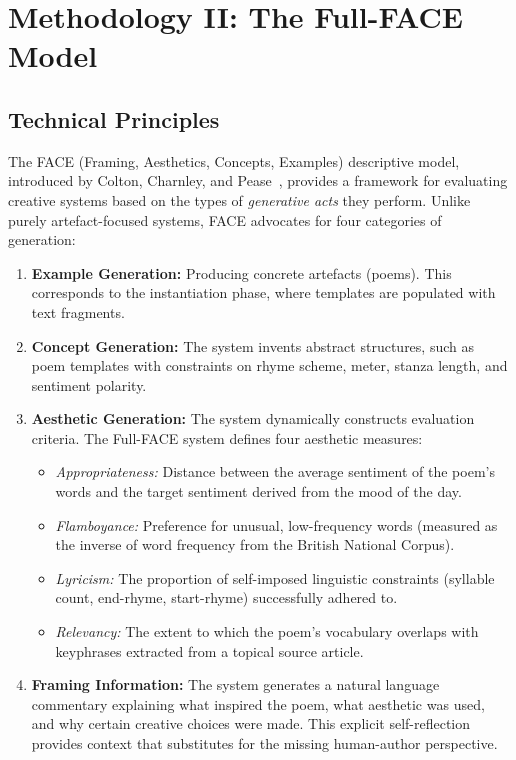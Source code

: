 \documentclass[conference]{IEEEtran}
\begin{document}
\section{Methodology II: The Full-FACE Model}
\label{sec:face}

\subsection{Technical Principles}

The FACE (Framing, Aesthetics, Concepts, Examples) descriptive model, introduced by Colton, Charnley, and Pease~\cite{colton2012face}, provides a framework for evaluating creative systems based on the types of \textit{generative acts} they perform. Unlike purely artefact-focused systems, FACE advocates for four categories of generation:

\begin{enumerate}
    \item \textbf{Example Generation:} Producing concrete artefacts (poems). This corresponds to the instantiation phase, where templates are populated with text fragments.
    \item \textbf{Concept Generation:} The system invents abstract structures, such as poem templates with constraints on rhyme scheme, meter, stanza length, and sentiment polarity.
    \item \textbf{Aesthetic Generation:} The system dynamically constructs evaluation criteria. The Full-FACE system defines four aesthetic measures:
    \begin{itemize}
        \item \textit{Appropriateness:} Distance between the average sentiment of the poem's words and the target sentiment derived from the mood of the day.
        \item \textit{Flamboyance:} Preference for unusual, low-frequency words (measured as the inverse of word frequency from the British National Corpus).
        \item \textit{Lyricism:} The proportion of self-imposed linguistic constraints (syllable count, end-rhyme, start-rhyme) successfully adhered to.
        \item \textit{Relevancy:} The extent to which the poem's vocabulary overlaps with keyphrases extracted from a topical source article.
    \end{itemize}
    \item \textbf{Framing Information:} The system generates a natural language commentary explaining what inspired the poem, what aesthetic was used, and why certain creative choices were made. This explicit self-reflection provides context that substitutes for the missing human-author perspective.
\end{enumerate}
\end{document}
